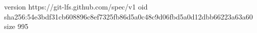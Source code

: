 version https://git-lfs.github.com/spec/v1
oid sha256:54e3bdf31cb608896c8ef7325fb86d5a0c48c9d06fbd5a0d12dbb66223a63a60
size 995

